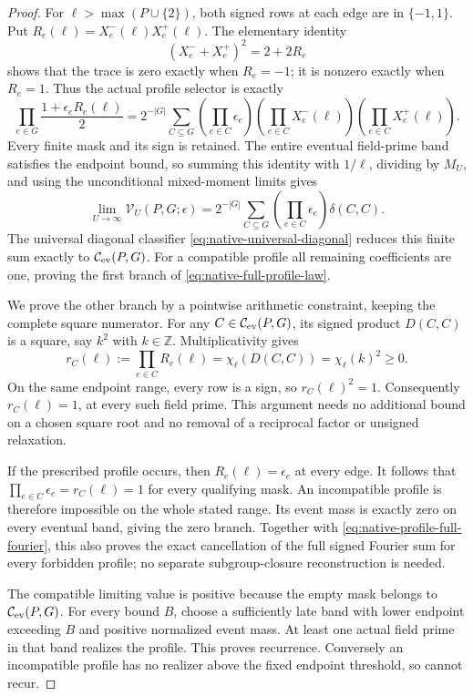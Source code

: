 \documentclass[11pt]{article}
\begin{document}
\begin{proof}
For \(\ell>\max(P\cup\{2\})\), both signed rows at each edge are
in \(\{-1,1\}\). Put
\(R_e(\ell)=X^-_e(\ell)X^+_e(\ell)\).
The elementary identity
\[
 (X^-_e+X^+_e)^2=2+2R_e
\]
shows that the trace is zero exactly when \(R_e=-1\); it is nonzero
exactly when \(R_e=1\). Thus the actual profile selector is exactly
\[
 \prod_{e\in G}\frac{1+\epsilon_eR_e(\ell)}2
 =
 2^{-|G|}\sum_{C\subseteq G}
    \left(\prod_{e\in C}\epsilon_e\right)
    \left(\prod_{e\in C}X^-_e(\ell)\right)
    \left(\prod_{e\in C}X^+_e(\ell)\right).
\]
Every finite mask and its sign is retained.
The entire eventual field-prime band satisfies the endpoint bound,
so summing this identity with \(1/\ell\), dividing by \(M_U\), and
using the unconditional mixed-moment limits gives
\begin{equation}\label{eq:native-profile-full-fourier}
 \lim_{U\to\infty}\mathcal V_U(P,G;\epsilon)
 =
 2^{-|G|}\sum_{C\subseteq G}
     \left(\prod_{e\in C}\epsilon_e\right)\delta(C,C).
\end{equation}
The universal diagonal classifier
\eqref{eq:native-universal-diagonal} reduces this finite sum exactly to
\(\mathcal C_{\rm ev}(P,G)\).
For a compatible profile all remaining coefficients are one, proving
the first branch of \eqref{eq:native-full-profile-law}.

We prove the other branch by a pointwise arithmetic constraint, keeping
the complete square numerator.
For any \(C\in\mathcal C_{\rm ev}(P,G)\), its signed product
\(D(C,C)\) is a square, say \(k^2\) with \(k\in\mathbb Z\).
Multiplicativity gives
\[
 r_C(\ell):=\prod_{e\in C}R_e(\ell)
   =\chi_\ell(D(C,C))=\chi_\ell(k)^2\geq0.
\]
On the same endpoint range, every row is a sign, so \(r_C(\ell)^2=1\).
Consequently \(r_C(\ell)=1\), at every such field prime.
This argument needs no additional bound on a chosen square root and
no removal of a reciprocal factor or unsigned relaxation.

If the prescribed profile occurs, then \(R_e(\ell)=\epsilon_e\)
at every edge. It follows that
\(\prod_{e\in C}\epsilon_e=r_C(\ell)=1\) for every qualifying mask.
An incompatible profile is therefore impossible on the whole stated
range. Its event mass is exactly zero on every eventual band,
giving the zero branch.
Together with \eqref{eq:native-profile-full-fourier}, this also proves
the exact cancellation of the full signed Fourier sum for every
forbidden profile; no separate subgroup-closure reconstruction is needed.

The compatible limiting value is positive because the empty mask
belongs to \(\mathcal C_{\rm ev}(P,G)\).
For every bound \(B\), choose a sufficiently late band with lower
endpoint exceeding \(B\) and positive normalized event mass.
At least one actual field prime in that band realizes the profile.
This proves recurrence. Conversely an incompatible profile has no
realizer above the fixed endpoint threshold, so cannot recur.


\end{proof}
\end{document}
